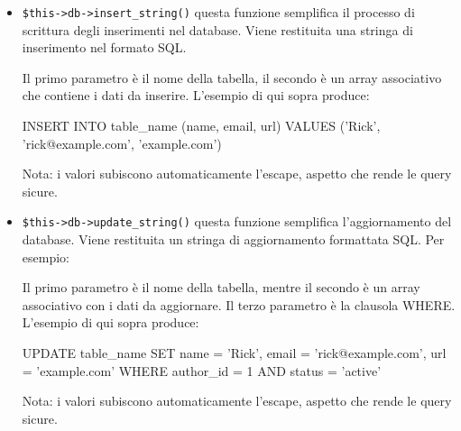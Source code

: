\begin{itemize}
\item \verb|$this->db->insert_string()| questa funzione semplifica il processo di scrittura degli inserimenti nel database. Viene restituita una stringa di inserimento nel formato SQL.


Il primo parametro è il nome della tabella, il secondo è un array associativo che contiene i dati da inserire. L'esempio di qui sopra produce:

\begin{code}
INSERT INTO table_name (name, email, url) VALUES ('Rick', 'rick@example.com', 'example.com')
\end{code}

Nota: i valori subiscono automaticamente l'escape, aspetto che rende le query sicure.

\item \verb|$this->db->update_string()| questa funzione semplifica l'aggiornamento del database. Viene restituita un stringa di aggiornamento formattata SQL. Per esempio:


Il primo parametro è il nome della tabella, mentre il secondo è un array associativo con i dati da aggiornare. Il terzo parametro è la clausola WHERE. L'esempio di qui sopra produce:

\begin{code}
UPDATE table_name SET name = 'Rick', email = 'rick@example.com', url = 'example.com' WHERE author_id = 1 AND status = 'active'
\end{code}

Nota: i valori subiscono automaticamente l'escape, aspetto che rende le query sicure.
\end{itemize}

